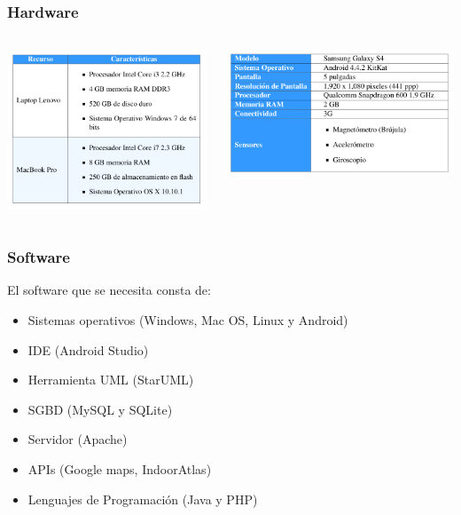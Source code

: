 \documentclass[12pt]{beamer}
\begin{document}
\begin{frame}
	\frametitle{Hardware}
	\begin{columns} 
		\begin{column}{6cm}
			\begin{center}
				\includegraphics[height=4.8cm]{imagenes/computadoras.png}
			\end{center}
		\end{column}
		\begin{column}{10cm} 
				\includegraphics[height=3.8cm]{imagenes/telefono.png}
		\end{column} 
	\end{columns}
\end{frame}


\begin{frame}
	\frametitle{Software}
		El software que se necesita consta de: 
		\begin{itemize}
		 	\item Sistemas operativos (Windows, Mac OS, Linux y Android)
		 	\item IDE (Android Studio)
		 	\item Herramienta UML (StarUML)
		 	\item SGBD (MySQL y SQLite)
		 	\item Servidor (Apache)
		 	\item APIs (Google maps, IndoorAtlas)
		 	\item Lenguajes de Programación (Java y PHP)		 	
		\end{itemize}
\end{frame}
\end{document}
